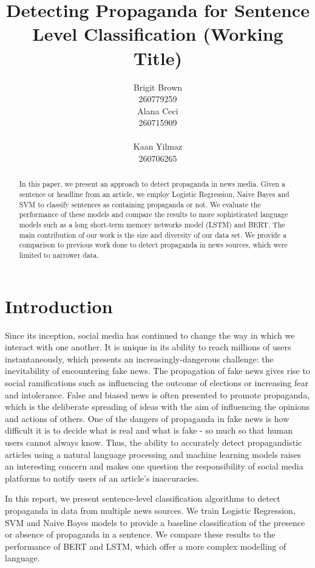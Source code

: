 \documentclass[11pt]{article}
\title{Detecting Propaganda for Sentence Level Classification (Working Title)}
\author{Brigit Brown \\
260779259 \\\And
 Alana Ceci \\
  260715909 \\
  \\\And
  Kaan Yilmaz \\
  260706265}
\date{}
\begin{document}
\maketitle
\begin{abstract}
In this paper, we present an approach to detect propaganda in news media. Given a sentence or headline from an article, we employ Logistic Regression, Naive Bayes and SVM to classify sentences as containing propaganda or not. We evaluate the performance of these models and compare the results to more sophisticated language models such as a long short-term memory networks model (LSTM) and BERT. The main contribution of our work is the size and diversity of our data set. We provide a comparison to previous work done to detect propaganda in news sources, which were limited to narrower data. 
\end{abstract}

\section{Introduction}

Since its inception, social media has continued to change the way in which we interact with one another.  It is unique in its ability to reach millions of users instantaneously, which presents an increasingly-dangerous challenge: the inevitability of encountering fake news. The propagation of fake news gives rise to social ramifications such as influencing the outcome of elections or increasing fear and intolerance. False and biased news is often presented to promote propaganda, which is the deliberate spreading of ideas with the aim of influencing the opinions and actions of others. One of the dangers of propaganda in fake news is how difficult it is to decide what is real and what is fake - so much so that human users cannot always know. Thus, the ability to accurately detect propagandistic articles using a natural language processing and machine learning models raises an interesting concern and makes one question the responsibility of social media platforms to notify users of an article's inaccuracies. 

In this report, we present sentence-level classification algorithms to detect propaganda in data from multiple news sources. We train Logistic Regression, SVM and Naive Bayes models to provide a baseline classification of the presence or absence of propaganda in a sentence.  We compare these results to the performance of BERT and LSTM, which offer a more complex modelling of language. 
\end{document}
